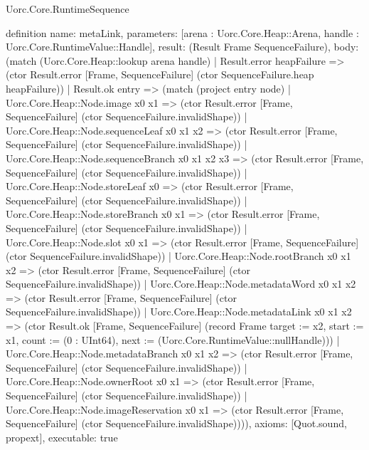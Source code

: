 \begin{lexlean}{Uorc.Core.RuntimeSequence}
\begin{semanticmodule}
definition{
  name: metaLink,
  parameters: [arena : Uorc.Core.Heap::Arena, handle : Uorc.Core.RuntimeValue::Handle],
  result: (Result Frame SequenceFailure),
  body: (match (Uorc.Core.Heap::lookup arena handle)
    | Result.error heapFailure => (ctor Result.error [Frame, SequenceFailure] (ctor SequenceFailure.heap heapFailure))
    | Result.ok entry => (match (project entry node)
      | Uorc.Core.Heap::Node.image x0 x1 => (ctor Result.error [Frame, SequenceFailure] (ctor SequenceFailure.invalidShape))
      | Uorc.Core.Heap::Node.sequenceLeaf x0 x1 x2 => (ctor Result.error [Frame, SequenceFailure] (ctor SequenceFailure.invalidShape))
      | Uorc.Core.Heap::Node.sequenceBranch x0 x1 x2 x3 => (ctor Result.error [Frame, SequenceFailure] (ctor SequenceFailure.invalidShape))
      | Uorc.Core.Heap::Node.storeLeaf x0 => (ctor Result.error [Frame, SequenceFailure] (ctor SequenceFailure.invalidShape))
      | Uorc.Core.Heap::Node.storeBranch x0 x1 => (ctor Result.error [Frame, SequenceFailure] (ctor SequenceFailure.invalidShape))
      | Uorc.Core.Heap::Node.slot x0 x1 => (ctor Result.error [Frame, SequenceFailure] (ctor SequenceFailure.invalidShape))
      | Uorc.Core.Heap::Node.rootBranch x0 x1 x2 => (ctor Result.error [Frame, SequenceFailure] (ctor SequenceFailure.invalidShape))
      | Uorc.Core.Heap::Node.metadataWord x0 x1 x2 => (ctor Result.error [Frame, SequenceFailure] (ctor SequenceFailure.invalidShape))
      | Uorc.Core.Heap::Node.metadataLink x0 x1 x2 => (ctor Result.ok [Frame, SequenceFailure] (record Frame {target := x2, start := x1, count := (0 : UInt64), next := (Uorc.Core.RuntimeValue::nullHandle)}))
      | Uorc.Core.Heap::Node.metadataBranch x0 x1 x2 => (ctor Result.error [Frame, SequenceFailure] (ctor SequenceFailure.invalidShape))
      | Uorc.Core.Heap::Node.ownerRoot x0 x1 => (ctor Result.error [Frame, SequenceFailure] (ctor SequenceFailure.invalidShape))
      | Uorc.Core.Heap::Node.imageReservation x0 x1 => (ctor Result.error [Frame, SequenceFailure] (ctor SequenceFailure.invalidShape)))),
  axioms: [Quot.sound, propext],
  executable: true
}


\end{semanticmodule}
\end{lexlean}
